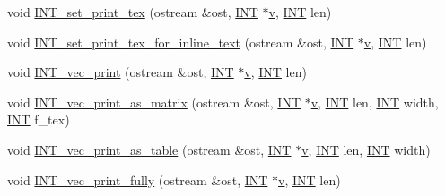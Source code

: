\begin{DoxyCompactItemize}
\item 
void \mbox{\hyperlink{util_8_c_adad0666de5d38c0caa4769f9f4756c0b}{I\+N\+T\+\_\+set\+\_\+print\+\_\+tex}} (ostream \&ost, \mbox{\hyperlink{galois_8h_a09fddde158a3a20bd2dcadb609de11dc}{I\+NT}} $\ast$\mbox{\hyperlink{simeon_8_c_aeb3f3030944801b163bc3b829a7f6710}{v}}, \mbox{\hyperlink{galois_8h_a09fddde158a3a20bd2dcadb609de11dc}{I\+NT}} len)
\item 
void \mbox{\hyperlink{util_8_c_a62f32a6d98d6c04e4073ba362867fe52}{I\+N\+T\+\_\+set\+\_\+print\+\_\+tex\+\_\+for\+\_\+inline\+\_\+text}} (ostream \&ost, \mbox{\hyperlink{galois_8h_a09fddde158a3a20bd2dcadb609de11dc}{I\+NT}} $\ast$\mbox{\hyperlink{simeon_8_c_aeb3f3030944801b163bc3b829a7f6710}{v}}, \mbox{\hyperlink{galois_8h_a09fddde158a3a20bd2dcadb609de11dc}{I\+NT}} len)
\item 
void \mbox{\hyperlink{util_8_c_a79a5901af0b47dd0d694109543c027fe}{I\+N\+T\+\_\+vec\+\_\+print}} (ostream \&ost, \mbox{\hyperlink{galois_8h_a09fddde158a3a20bd2dcadb609de11dc}{I\+NT}} $\ast$\mbox{\hyperlink{simeon_8_c_aeb3f3030944801b163bc3b829a7f6710}{v}}, \mbox{\hyperlink{galois_8h_a09fddde158a3a20bd2dcadb609de11dc}{I\+NT}} len)
\item 
void \mbox{\hyperlink{util_8_c_a72155bb8a3aef3942bf2cd40bf5f10a5}{I\+N\+T\+\_\+vec\+\_\+print\+\_\+as\+\_\+matrix}} (ostream \&ost, \mbox{\hyperlink{galois_8h_a09fddde158a3a20bd2dcadb609de11dc}{I\+NT}} $\ast$\mbox{\hyperlink{simeon_8_c_aeb3f3030944801b163bc3b829a7f6710}{v}}, \mbox{\hyperlink{galois_8h_a09fddde158a3a20bd2dcadb609de11dc}{I\+NT}} len, \mbox{\hyperlink{galois_8h_a09fddde158a3a20bd2dcadb609de11dc}{I\+NT}} width, \mbox{\hyperlink{galois_8h_a09fddde158a3a20bd2dcadb609de11dc}{I\+NT}} f\+\_\+tex)
\item 
void \mbox{\hyperlink{util_8_c_a2fa979d22386f64bd3823dded0177c3f}{I\+N\+T\+\_\+vec\+\_\+print\+\_\+as\+\_\+table}} (ostream \&ost, \mbox{\hyperlink{galois_8h_a09fddde158a3a20bd2dcadb609de11dc}{I\+NT}} $\ast$\mbox{\hyperlink{simeon_8_c_aeb3f3030944801b163bc3b829a7f6710}{v}}, \mbox{\hyperlink{galois_8h_a09fddde158a3a20bd2dcadb609de11dc}{I\+NT}} len, \mbox{\hyperlink{galois_8h_a09fddde158a3a20bd2dcadb609de11dc}{I\+NT}} width)
\item 
void \mbox{\hyperlink{util_8_c_aff2e5a86c89315b7cec22a5a77f94a25}{I\+N\+T\+\_\+vec\+\_\+print\+\_\+fully}} (ostream \&ost, \mbox{\hyperlink{galois_8h_a09fddde158a3a20bd2dcadb609de11dc}{I\+NT}} $\ast$\mbox{\hyperlink{simeon_8_c_aeb3f3030944801b163bc3b829a7f6710}{v}}, \mbox{\hyperlink{galois_8h_a09fddde158a3a20bd2dcadb609de11dc}{I\+NT}} len)

\end{DoxyCompactItemize}
